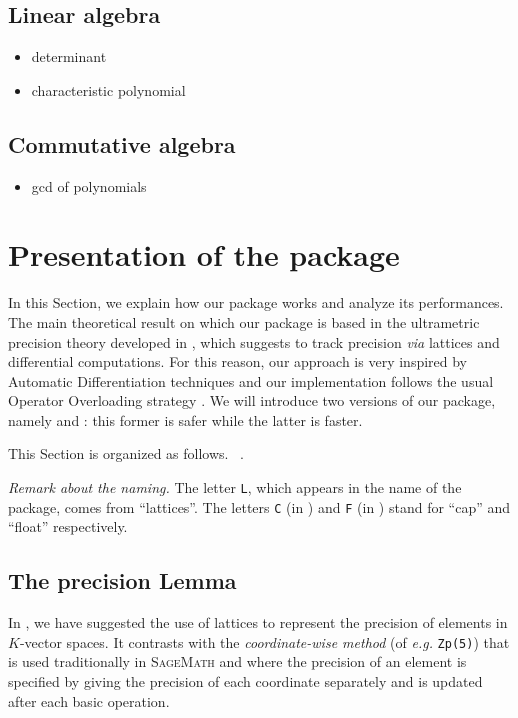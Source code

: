 \documentclass[sigconf]{acmart}
\newcommand{\sage}{\textsc{SageMath}\xspace}
\newcommand{\ZpL}{\text{\rm \tt ZpL}\xspace}
\newcommand{\ZpLC}{\text{\rm \tt ZpLC}\xspace}
\newcommand{\ZpLF}{\text{\rm \tt ZpLF}\xspace}
\def\todo#1{\ \!\!{\color{red} #1}}
\theoremstyle{definition}
\begin{document}
\subsection{Linear algebra}

\begin{itemize}
\item determinant
\item characteristic polynomial
\end{itemize}

\subsection{Commutative algebra}

\begin{itemize}
\item gcd of polynomials
\end{itemize}

\section{Presentation of the package}

In this Section, we explain how our package \ZpL works and analyze
its performances.
The main theoretical result on which our package is based in the 
ultrametric precision theory developed in \cite{padicprec}, which 
suggests to track precision \emph{via} lattices and differential 
computations. For this reason, our approach is very inspired by 
Automatic Differentiation techniques \cite{} and our implementation 
follows the usual Operator Overloading strategy \cite{}.
We will introduce two versions of our package, namely \ZpLC and \ZpLF: 
this former is safer while the latter is faster.

This Section is organized as follows.
\todo{[...]}.

\smallskip

\noindent \textit{Remark about the naming.}
%
The letter \texttt{L}, which appears in the name of the package, 
comes from ``lattices''. The letters \texttt{C} (in \ZpLC) and 
\texttt{F} (in \ZpLF) stand for ``cap'' and ``float'' respectively.

\subsection{The precision Lemma}
\label{ssec:preclemma}

In \cite{caruso-roe-vaccon:14a}, we have suggested the 
use of lattices to represent the precision of elements in 
$K$-vector spaces.  It contrasts with the
\emph{coordinate-wise method} (of \textit{e.g.}
 \verb?Zp(5)?) that is used traditionally in \sage and
where the precision of an element is specified by giving the precision
of each coordinate separately and is updated after each basic
operation.
\end{document}
